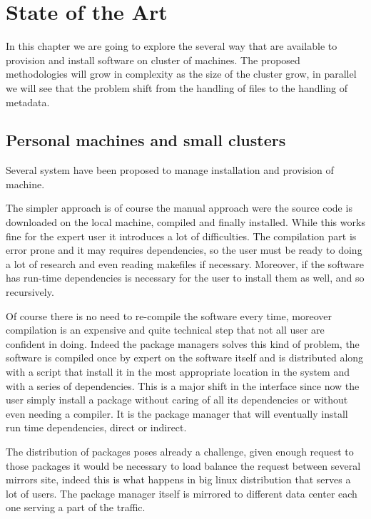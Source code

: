 \chapter{State of the Art}\label{ch:SoA}

In this chapter we are going to explore the several way that are available to
provision and install software on cluster of machines. The proposed
methodologies will grow in complexity as the size of the cluster grow, in
parallel we will see that the problem shift from the handling of files to the
handling of metadata.

\section{Personal machines and small clusters}

Several system have been proposed to manage installation and provision of machine.

The simpler approach is of course the manual approach were the source code is
downloaded on the local machine, compiled and finally installed. While this
works fine for the expert user it introduces a lot of difficulties. The
compilation part is error prone and it may requires dependencies, so the user
must be ready to doing a lot of research and even reading makefiles if
necessary. Moreover, if the software has run-time dependencies is necessary for
the user to install them as well, and so recursively.

Of course there is no need to re-compile the software every time, moreover
compilation is an expensive and quite technical step that not all user are
confident in doing.  Indeed the package managers solves this kind of problem,
the software is compiled once by expert on the software itself and is
distributed along with a script that install it in the most appropriate
location in the system and with a series of dependencies. This is a major shift
in the interface since now the user simply install a package without caring of
all its dependencies or without even needing a compiler. It is the package
manager that will eventually install run time dependencies, direct or indirect.

The distribution of packages poses already a challenge, given enough request to
those packages it would be necessary to load balance the request between
several mirrors site, indeed this is what happens in big linux distribution
that serves a lot of users. The package manager itself is mirrored to different
data center each one serving a part of the traffic.

